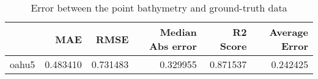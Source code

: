 \begin{table}[h!]
\caption{Error between the point bathymetry and ground-truth data}
\label{tab:oahu5_lidar_error}
\begin{tabular}{lrrrrr}
\toprule
 & MAE & RMSE & Median Abs error & R2 Score & Average Error \\
\midrule
oahu5 & 0.483410 & 0.731483 & 0.329955 & 0.871537 & 0.242425 \\
\bottomrule
\end{tabular}
\end{table}
